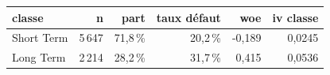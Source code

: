 \begin{tabular}{lrrrrr}
\toprule
\textbf{classe} & \textbf{n} & \textbf{part} & \textbf{taux défaut} & \textbf{woe} & \textbf{iv classe} \\
\midrule
Short Term & 5\,647 & 71,8\,\% & 20,2\,\% & -0,189 & 0,0245 \\
Long Term & 2\,214 & 28,2\,\% & 31,7\,\% & 0,415 & 0,0536 \\
\bottomrule
\end{tabular}
